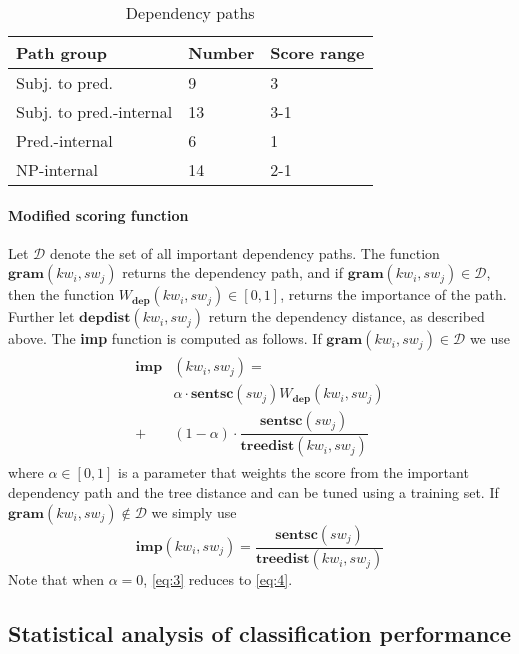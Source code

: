 \documentclass[11pt]{article}
\begin{document}
\begin{table}[h]
\begin{center}
\begin{tabular}{|l|l|l|}
\hline \bf Path group & \bf Number & \bf Score range \\ \hline
Subj. to pred. & 9 & 3 \\
Subj. to pred.-internal & 13 & 3-1 \\
Pred.-internal & 6 & 1 \\
NP-internal & 14 & 2-1 \\
\hline
\end{tabular}
\end{center}
\caption{\label{deppath} Dependency paths}
\end{table}


\paragraph{Modified scoring function}
Let $\mathcal{D}$ denote the set of all important dependency paths. The function $\mathbf{gram}(kw_i, sw_{j})$ returns the dependency path, and if $\mathbf{gram}(kw_i, sw_{j}) \in \mathcal{D}$, then the function $W_{\mathbf{dep}}(kw_i, sw_{j}) \in [0,1]$, returns the importance of the path. Further let $\mathbf{depdist}(kw_i, sw_{j})$ return the dependency distance, as described above. The \textbf{imp} function is computed as follows. If $\mathbf{gram}(kw_i, sw_{j}) \in \mathcal{D}$ we use
\begin{align}
  \begin{split}
    \label{eq:3}
  \mathbf{imp}&(kw_i, sw_{j}) = \\
  &\alpha \cdot \mathbf{sentsc}(sw_{j}) W_{\mathbf{dep}}(kw_i, sw_{j}) \\
  +&(1 - \alpha) \cdot \dfrac{\mathbf{sentsc}(sw_{j})}{\mathbf{treedist}(kw_i, sw_{j})}    
  \end{split}
\end{align}
where $\alpha \in [0,1]$ is a parameter that weights the score from the important dependency path and the tree distance and can be tuned using a training set. If $\mathbf{gram}(kw_i, sw_{j}) \not\in \mathcal{D}$ we simply use 
\begin{equation}
  \label{eq:4}
  \mathbf{imp}(kw_i, sw_{j}) = \dfrac{\mathbf{sentsc}(sw_{j})}{\mathbf{treedist}(kw_i, sw_{j})}    
\end{equation}
Note that when $\alpha = 0$, \eqref{eq:3} reduces to \eqref{eq:4}.

\subsection{Statistical analysis of classification performance}
\label{sec:sa}
\end{document}
